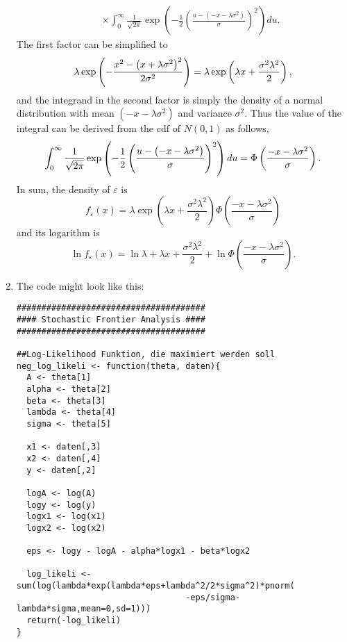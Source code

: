 \begin{Solution}{12.10}
\begin{enumerate}
\begin{eqnarray*}
&&\times \int_{0}^{\infty }\frac{1}{\sqrt{2\pi }}\exp \left( -\frac{1}{2}%
\left( \frac{u-\left( -x-\lambda \sigma ^{2}\right) }{\sigma }\right)
^{2}\right) du.
\end{eqnarray*}%
The first factor can be simplified to%
\begin{equation*}
\lambda \exp \left( -\frac{x^{2}-\left( x+\lambda \sigma ^{2}\right) ^{2}}{%
2\sigma ^{2}}\right) =\lambda \exp \left( \lambda x+\frac{\sigma ^{2}\lambda
^{2}}{2}\right) ,
\end{equation*}%
and the integrand in the second factor is simply the density of a normal
distribution with mean $\left( -x-\lambda \sigma ^{2}\right) $ and variance $%
\sigma ^{2}$. Thus the value of the integral can be derived from the cdf of $%
N(0,1)$ as follows,%
\begin{equation*}
\int_{0}^{\infty }\frac{1}{\sqrt{2\pi }}\exp \left( -\frac{1}{2}\left( \frac{%
u-\left( -x-\lambda \sigma ^{2}\right) }{\sigma }\right) ^{2}\right) du=\Phi
\left( \frac{-x-\lambda \sigma ^{2}}{\sigma }\right) .
\end{equation*}%
In sum, the density of $\varepsilon $ is%
\begin{equation*}
f_{\varepsilon }\left( x\right) =\lambda \exp \left( \lambda x+\frac{\sigma
^{2}\lambda ^{2}}{2}\right) \Phi \left( \frac{-x-\lambda \sigma ^{2}}{\sigma
}\right)
\end{equation*}%
and its logarithm is%
\begin{equation*}
\ln f_{\varepsilon }\left( x\right) =\ln \lambda +\lambda x+\frac{\sigma
^{2}\lambda ^{2}}{2}+\ln \Phi \left( \frac{-x-\lambda \sigma ^{2}}{\sigma }%
\right) .
\end{equation*}

\item The code might look like this:
\begin{verbatim}
######################################
#### Stochastic Frontier Analysis ####
######################################

##Log-Likelihood Funktion, die maximiert werden soll
neg_log_likeli <- function(theta, daten){
  A <- theta[1]
  alpha <- theta[2]
  beta <- theta[3]
  lambda <- theta[4]
  sigma <- theta[5]

  x1 <- daten[,3]
  x2 <- daten[,4]
  y <- daten[,2]

  logA <- log(A)
  logy <- log(y)
  logx1 <- log(x1)
  logx2 <- log(x2)

  eps <- logy - logA - alpha*logx1 - beta*logx2

  log_likeli <- sum(log(lambda*exp(lambda*eps+lambda^2/2*sigma^2)*pnorm(
                                  -eps/sigma-lambda*sigma,mean=0,sd=1)))
  return(-log_likeli)
}


\end{verbatim}
\end{enumerate}
\end{Solution}
